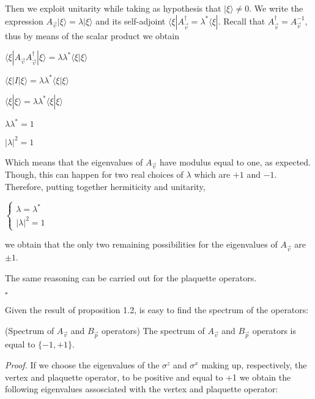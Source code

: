\documentclass{Configuration_Files/PoliMi3i_thesis}
\begin{document}
Then we exploit unitarity while taking as hypothesis that $|\xi \rangle \neq 0$. 
We write the expression $A_{\vec{v}} |\xi \rangle = \lambda |\xi \rangle$ and its self-adjoint $\langle \xi| A_{\vec{v}}^{\dagger} = \lambda^* \langle \xi|$. Recall that $A_{\vec{v}}^{\dagger}=A_{\vec{v}}^{-1}$, thus by means of the scalar product we obtain 

\begin{center}
	$\langle \xi|A_{\vec{v}} A_{\vec{v}}^{\dagger}|\xi\rangle = \lambda \lambda^* \langle \xi |\xi \rangle$
	
	$\langle \xi|I|\xi \rangle = \lambda \lambda^* \langle \xi |\xi \rangle$
	
	$\langle \xi|\xi \rangle = \lambda \lambda^* \langle \xi |\xi \rangle $
	
	$ \lambda \lambda^* = 1 $
	
	$ |\lambda|^2 = 1 $
\end{center}

Which means that the eigenvalues of $A_{\vec{v}}$ have modulus equal to one, as expected. Though, this can happen for two real choices of $\lambda$ which are $+1$ and $-1$.
Therefore, putting together hermiticity and unitarity, 

\begin{center}
$\begin{cases}
	 \lambda = \lambda^* \\
	 |\lambda|^2 = 1 
\end{cases}$
\end{center}

we obtain that the only two remaining possibilities for the eigenvalues of $A_{\vec{v}}$ are $\pm 1$. \newline

The same reasoning can be carried out for the plaquette operators.

\hfill $\square$ 

Given the result of proposition 1.2, is easy to find the spectrum of the operators: 

\begin{proposition} (Spectrum of $A_{\vec{v}}$ and $B_{\vec{p}}$ operators) The spectrum of $A_{\vec{v}}$ and $B_{\vec{p}}$ operators is equal to $\{-1,+1\}$. 
\end{proposition}

\textit{Proof.}\newline
If we choose the eigenvalues of the $\sigma^z$ and $\sigma^x$ making up, respectively, the vertex and plaquette operator, to be positive and equal to +1 we obtain the following eigenvalues assosciated with the vertex and plaquette operator:
\end{document}
